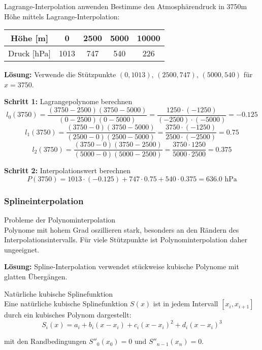 \begin{example2}{Lagrange-Interpolation anwenden}
    Bestimme den Atmosphärendruck in 3750m Höhe mittels Lagrange-Interpolation:
\begin{center}
\begin{tabular}{|c|c|c|c|c|}
\hline
Höhe [m] & 0 & 2500 & 5000 & 10000 \\
\hline
Druck [hPa] & 1013 & 747 & 540 & 226 \\
\hline
\end{tabular}
\end{center}
\tcblower
\textbf{Lösung:}
Verwende die Stützpunkte $(0, 1013)$, $(2500, 747)$, $(5000, 540)$ für $x = 3750$.

\textbf{Schritt 1:} Lagrangepolynome berechnen
$$l_0(3750) = \frac{(3750-2500)(3750-5000)}{(0-2500)(0-5000)} = \frac{1250 \cdot (-1250)}{(-2500) \cdot (-5000)} = -0.125$$
$$l_1(3750) = \frac{(3750-0)(3750-5000)}{(2500-0)(2500-5000)} = \frac{3750 \cdot (-1250)}{2500 \cdot (-2500)} = 0.75$$
$$l_2(3750) = \frac{(3750-0)(3750-2500)}{(5000-0)(5000-2500)} = \frac{3750 \cdot 1250}{5000 \cdot 2500} = 0.375$$

\textbf{Schritt 2:} Interpolationswert berechnen
$$P(3750) = 1013 \cdot (-0.125) + 747 \cdot 0.75 + 540 \cdot 0.375 = 636.0 \text{ hPa}$$
\end{example2}

\raggedcolumns
\columnbreak

\subsubsection{Splineinterpolation}

\begin{concept}{Probleme der Polynominterpolation}\\
Polynome mit hohem Grad oszillieren stark, besonders an den Rändern des Interpolationsintervalls. Für viele Stützpunkte ist Polynominterpolation daher ungeeignet.

\textbf{Lösung:} Spline-Interpolation verwendet stückweise kubische Polynome mit glatten Übergängen.
\end{concept}

\begin{definition}{Natürliche kubische Splinefunktion}\\
Eine natürliche kubische Splinefunktion $S(x)$ ist in jedem Intervall $[x_i, x_{i+1}]$ durch ein kubisches Polynom dargestellt:
$$S_i(x) = a_i + b_i(x - x_i) + c_i(x - x_i)^2 + d_i(x - x_i)^3$$

mit den Randbedingungen $S''_0(x_0) = 0$ und $S''_{n-1}(x_n) = 0$.
\end{definition}

